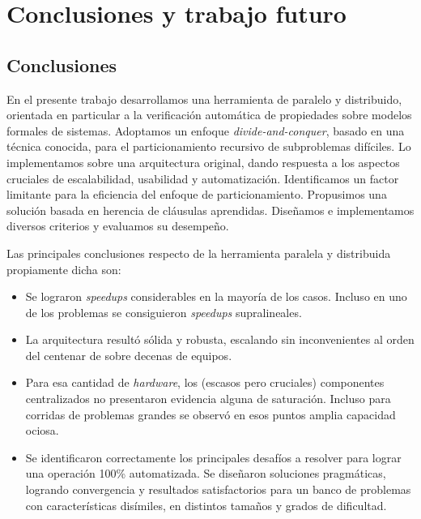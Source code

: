 \chapter{Conclusiones y trabajo futuro}
\label{conclu}


\section{Conclusiones}

En el presente trabajo desarrollamos una herramienta de \ssolving paralelo y
distribuido, orientada en particular a la verificación automática de
propiedades sobre modelos formales de sistemas. Adoptamos un enfoque \emph
{divide-and-conquer}, basado en una técnica conocida, para el particionamiento
recursivo de subproblemas difíciles. Lo implementamos sobre una arquitectura
original, dando respuesta a los aspectos cruciales de escalabilidad,
usabilidad y automatización. Identificamos un factor limitante para la
eficiencia del enfoque de particionamiento. Propusimos una solución basada en
herencia de cláusulas aprendidas. Diseñamos e implementamos diversos criterios
y evaluamos su desempeño.

\medskip

Las principales conclusiones respecto de la herramienta paralela y distribuida
propiamente dicha son:

\begin{itemize}

\item Se lograron \emph{speedups} considerables en la mayoría de los casos. Incluso en uno de los problemas se consiguieron \emph{speedups} supralineales.

\item La arquitectura resultó sólida y robusta, escalando sin inconvenientes al orden del centenar de \ws sobre decenas de equipos.

\item Para esa cantidad de \emph{hardware}, los (escasos pero cruciales) componentes centralizados no presentaron evidencia alguna de saturación. Incluso para corridas de problemas grandes se observó en esos puntos amplia capacidad ociosa.

\item Se identificaron correctamente los principales desafíos a resolver para lograr una operación 100\% automatizada. Se diseñaron soluciones pragmáticas, logrando convergencia y resultados satisfactorios para un banco de problemas con características disímiles, en distintos tamaños y grados de dificultad.

\end{itemize}



